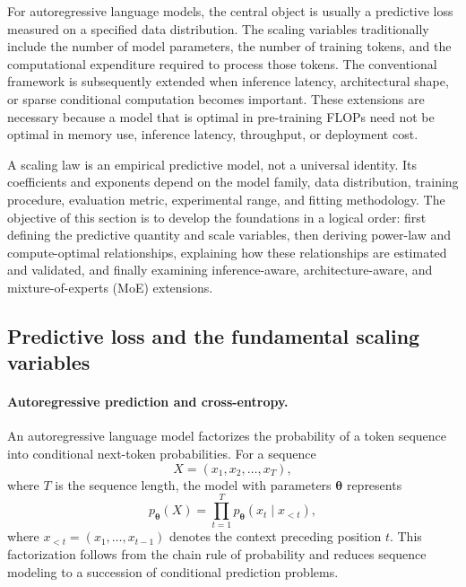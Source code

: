 For autoregressive language models, the central object is usually a predictive
loss measured on a specified data distribution. The scaling variables
traditionally include the number of model parameters, the number of training
tokens, and the computational expenditure required to process those tokens.
The conventional framework is subsequently extended when inference latency,
architectural shape, or sparse conditional computation becomes important.
These extensions are necessary because a model that is optimal in pre-training
FLOPs need not be optimal in memory use, inference latency, throughput, or
deployment cost.

A scaling law is an empirical predictive model, not a universal identity.
Its coefficients and exponents depend on the model family, data distribution,
training procedure, evaluation metric, experimental range, and fitting
methodology. The objective of this section is to develop the foundations in a
logical order: first defining the predictive quantity and scale variables,
then deriving power-law and compute-optimal relationships, explaining how
these relationships are estimated and validated, and finally examining
inference-aware, architecture-aware, and mixture-of-experts (MoE) extensions.


\subsection{Predictive loss and the fundamental scaling variables}
\label{subsec:scaling-foundations-loss}

\paragraph{Autoregressive prediction and cross-entropy.}
An autoregressive language model factorizes the probability of a token
sequence into conditional next-token probabilities. For a sequence
\[
    X=(x_1,x_2,\ldots,x_T),
\]
where \(T\) is the sequence length, the model with parameters
\(\boldsymbol{\theta}\) represents
\begin{equation}
    p_{\boldsymbol{\theta}}(X)
    =
    \prod_{t=1}^{T}
    p_{\boldsymbol{\theta}}(x_t\mid x_{<t}),
    \label{eq:scaling-autoregressive-factorization}
\end{equation}
where \(x_{<t}=(x_1,\ldots,x_{t-1})\) denotes the context preceding position
\(t\). This factorization follows from the chain rule of probability and
reduces sequence modeling to a succession of conditional prediction problems.


